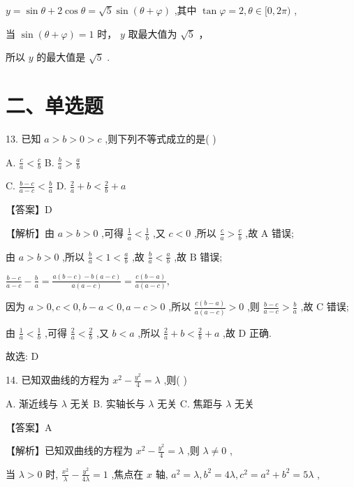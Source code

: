 \documentclass[10pt]{article}
\begin{document}
\(y = \sin \theta  + 2\cos \theta  = \sqrt{5}\sin \left( {\theta  + \varphi }\right)\) ,其中 \(\tan \varphi  = 2,\theta  \in  \lbrack 0,{2\pi })\) ,

当 \(\sin \left( {\theta  + \varphi }\right)  = 1\) 时， \(y\) 取最大值为 \(\sqrt{5}\) ，

所以 \(y\) 的最大值是 \(\sqrt{5}\) .

\section*{二、单选题}

13. 已知 \(a > b > 0 > c\) ,则下列不等式成立的是( )

A. \(\frac{c}{a} < \frac{c}{b}\) B. \(\frac{b}{a} > \frac{a}{b}\)

C. \(\frac{b - c}{a - c} < \frac{b}{a}\) D. \(\frac{2}{a} + b < \frac{2}{b} + a\)

【答案】D

【解析】由 \(a > b > 0\) ,可得 \(\frac{1}{a} < \frac{1}{b}\) ,又 \(c < 0\) ,所以 \(\frac{c}{a} > \frac{c}{b}\) ,故 A 错误;

由 \(a > b > 0\) ,所以 \(\frac{b}{a} < 1 < \frac{a}{b}\) ,故 \(\frac{b}{a} < \frac{a}{b}\) ,故 \(\mathrm{B}\) 错误;

\(\frac{b - c}{a - c} - \frac{b}{a} = \frac{a\left( {b - c}\right)  - b\left( {a - c}\right) }{a\left( {a - c}\right) } = \frac{c\left( {b - a}\right) }{a\left( {a - c}\right) },\)

因为 \(a > 0,c < 0,b - a < 0,a - c > 0\) ,所以 \(\frac{c\left( {b - a}\right) }{a\left( {a - c}\right) } > 0\) ,则 \(\frac{b - c}{a - c} > \frac{b}{a}\) ,故 C 错误;

由 \(\frac{1}{a} < \frac{1}{b}\) ,可得 \(\frac{2}{a} < \frac{2}{b}\) ,又 \(b < a\) ,所以 \(\frac{2}{a} + b < \frac{2}{b} + a\) ,故 \(\mathrm{D}\) 正确.

故选: D

14. 已知双曲线的方程为 \({x}^{2} - \frac{{y}^{2}}{4} = \lambda\) ,则( )

A. 渐近线与 \(\lambda\) 无关 B. 实轴长与 \(\lambda\) 无关 C. 焦距与 \(\lambda\) 无关

【答案】A

【解析】已知双曲线的方程为 \({x}^{2} - \frac{{y}^{2}}{4} = \lambda\) ,则 \(\lambda  \neq  0\) ,

当 \(\lambda  > 0\) 时, \(\frac{{x}^{2}}{\lambda } - \frac{{y}^{2}}{4\lambda } = 1\) ,焦点在 \(x\) 轴, \({a}^{2} = \lambda ,{b}^{2} = {4\lambda },{c}^{2} = {a}^{2} + {b}^{2} = {5\lambda }\) ,
\end{document}
